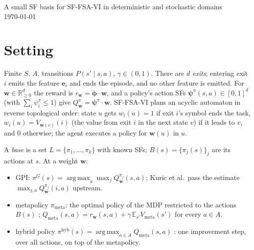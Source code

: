 \documentclass[11pt]{article}
\newcommand{\vphi}{\bm{\phi}}
\newcommand{\vpsi}{\bm{\psi}}
\newcommand{\w}{\mathbf{w}}
\newcommand{\e}{\mathbf{e}}
\newcommand{\R}{\mathbb R}
\DeclareMathOperator*{\argmax}{arg\,max}
\begin{document}
\begin{center}
{\Large A small SF basis for SF-FSA-VI in deterministic and stochastic domains}\\[2pt]
{\small \today}
\end{center}

\section{Setting}
Finite $S$, $A$, transitions $P(s'\mid s,a)$, $\gamma\in(0,1)$. There are $d$ \emph{exits}; entering exit $i$ emits the
feature $\e_i$ and ends the episode, and no other feature is emitted. For $\w\in\R^d_{\ge0}$ the reward is
$r_\w=\vphi\cdot\w$, and a policy's action SFs $\vpsi^\pi(s,a)\in[0,1]^d$ (with $\sum_i\psi^\pi_i\le1$) give
$Q^\pi_\w=\vpsi^\pi\cdot\w$. SF-FSA-VI \cite{kuric} plans an acyclic automaton in reverse topological order: state $u$
gets $w_i(u)=1$ if exit $i$'s symbol ends the task, $w_i(u)=V_{\w(v)}(i)$ (the value from exit $i$ in the next state $v$)
if it leads to $v$, and $0$ otherwise; the agent executes a policy for $\w(u)$ in $u$.

A \emph{base} is a set $L=\{\pi_1,\dots,\pi_k\}$ with known SFs; $B(s)=\{\pi_j(s)\}_j$ are its actions at $s$. At a
weight $\w$:
\begin{itemize}\setlength\itemsep{1pt}
\item GPI: $\pi^G(s)=\argmax_{a}\max_j Q^{\pi_j}_\w(s,a)$; Kuric et al.\ pass the estimate $\max_{j,a}Q^{\pi_j}_\w(i,a)$ upstream.
\item metapolicy $\pi_{\mathrm{meta}}$: the optimal policy of the MDP restricted to the actions $B(s)$ \cite{cog};
$Q_{\mathrm{meta}}(s,a)=r_\w(s,a)+\gamma\,\mathbb E_{s'}V_{\mathrm{meta}}(s')$ for every $a\in A$.
\item hybrid policy $\pi^{\mathrm{hyb}}(s)=\argmax_{a\in A}Q_{\mathrm{meta}}(s,a)$ \cite{cog}: one improvement step, over all
actions, on top of the metapolicy.
\end{itemize}
\end{document}
